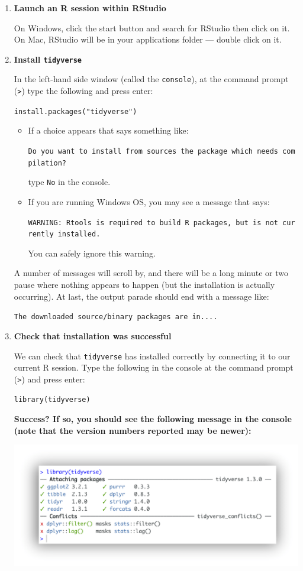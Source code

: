 \documentclass[]{book}
\begin{document}
\begin{enumerate}
\def\labelenumi{\arabic{enumi}.}
\item
  \textbf{Launch an R session within RStudio}

  On Windows, click the start button and search for RStudio then click on it. On Mac,
  RStudio will be in your applications folder --- double click on it.
\item
  \textbf{Install \texttt{tidyverse}}

  In the left-hand side window (called the \texttt{console}), at the command prompt (\texttt{\textgreater{}}) type the following and press enter:

  \texttt{install.packages("tidyverse")}

  \begin{itemize}
  \item
    If a choice appears that says something like:

    \texttt{Do\ you\ want\ to\ install\ from\ sources\ the\ package\ which\ needs\ compilation?}

    type \texttt{No} in the console.
  \item
    If you are running Windows OS, you may see a message that says:

    \texttt{WARNING:\ Rtools\ is\ required\ to\ build\ R\ packages,\ but\ is\ not\ currently\ installed.}

    You can safely ignore this warning.
  \end{itemize}

  A number of messages will scroll by, and there will be a long minute or two
  pause where nothing appears to happen (but the installation is actually occurring).
  At last, the output parade should end with a message like:

  \texttt{The\ downloaded\ source/binary\ packages\ are\ in....}
\item
  \textbf{Check that installation was successful}

  We can check that \texttt{tidyverse} has installed correctly by connecting it to our current R session.
  Type the following in the console at the command prompt (\texttt{\textgreater{}}) and press enter:

  \texttt{library(tidyverse)}

  \textbf{Success? If so, you should see the following message in the console (note that the version numbers reported may be newer):}

  \includegraphics{R/Rinstall/images/tidyverse_install.png}


\end{enumerate}
\end{document}
